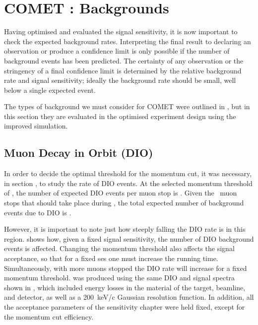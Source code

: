
\chapter{COMET \phaseII: Backgrounds}
Having optimised and evaluated the signal sensitivity, it is now important to check the expected background rates.
Interpreting the final result to declaring an observation or produce a confidence limit is only possible if the number of background events has been predicted.
The certainty of any observation or the stringency of a final confidence limit is determined by the relative background rate and signal sensitivity; ideally the background rate should be small, well below a single expected event.

The types of background we must consider for COMET were outlined in , but in this section they are evaluated in the optimised experiment design using the improved simulation.

\FigDIOBackground
\section{Muon Decay in Orbit (\acs{DIO})}
In order to decide the optimal threshold for the momentum cut, it was necessary, in section , to study the rate of \ac{DIO} events.
At the selected momentum threshold of \VarMomThreshold, the number of expected DIO events per muon stop is \VarDIOPerMuStop{}.
Given the \VarTotalMuStops~muon stops that should take place during \phaseII, the total expected number of background events due to DIO is \VarDIOTotal.

However, it is important to note just how steeply falling the DIO rate is in this region.
 shows how, given a fixed signal sensitivity, the number of DIO background events is affected.
Changing the momentum threshold also affects the signal acceptance, so that for a fixed \ac{ses} one must increase the running time.
Simultaneously, with more muons stopped the \ac{DIO} rate will increase for a fixed momentum threshold.
 was produced using the same DIO and signal spectra shown in , which included energy losses in the material of the target, beamline, and detector, as well as a 200~keV/c Gaussian resolution function. 
In addition, all the acceptance parameters of the sensitivity chapter were held fixed, except for the momentum cut efficiency.

